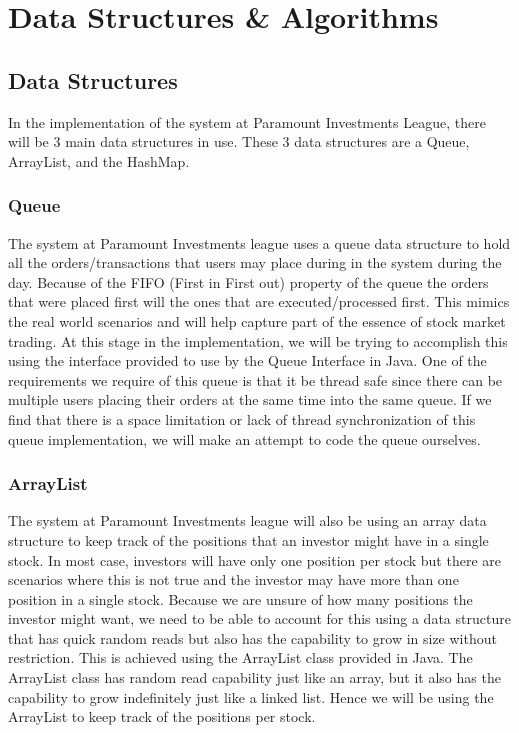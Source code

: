 
\chapter{Data Structures \& Algorithms}

\section{Data Structures}

In the implementation of the system at Paramount Investments League, there will
be 3 main data structures in use.  These 3 data structures are a Queue,
ArrayList, and the HashMap.

\subsection{Queue}
The system at Paramount Investments league uses a queue data structure to
hold all the orders/transactions that users may place during in the system
during the day.  Because of the FIFO (First in First out) property of the queue
the orders that were placed first will the ones that are executed/processed
first.  This mimics the real world scenarios and will help capture part of the
essence of stock market trading.  At this stage in the implementation, we will
be trying to accomplish this using the interface provided to use by the Queue
Interface in Java.  One of the requirements we require of this queue is that it
be thread safe since there can be multiple users placing their orders at the
same time into the same queue.  If we find that there is a space limitation or
lack of thread synchronization of this queue implementation, we will make an
attempt to code the queue ourselves.

\subsection{ArrayList}
The system at Paramount Investments league will also be using an array data
structure to keep track of the positions that an investor might have in a single
stock.  In most case, investors will have only one position per stock but there
are scenarios where this is not true and the investor may have more than one
position in a single stock.  Because we are unsure of how many positions the
investor might want, we need to be able to account for this using a data
structure that has quick random reads but also has the capability to grow in
size without restriction.  This is achieved using the ArrayList class provided
in Java.  The ArrayList class has random read capability just like an array, but
it also has the capability to grow indefinitely just like a linked list.  Hence
we will be using the ArrayList to keep track of the positions per stock.

